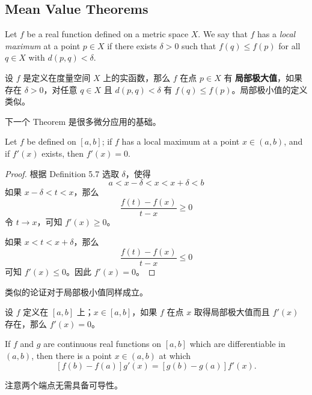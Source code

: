 \documentclass[../poma-notes.tex]{subfiles}
\begin{document}
\subsection*{Mean Value Theorems}

\begin{definition}
  Let $f$ be a real function defined on a metric space $X$. We say that $f$ has a \textit{local maximum} at a
  point $p \in X$ if there exists $\delta > 0$ such that $f(q) \le f(p)$ for all $q \in X$ with $d(p,q)<\delta$.
\end{definition}

\begin{anote}
  设 $f$ 是定义在度量空间 $X$ 上的实函数，那么 $f$ 在点 $p \in X$ 有 \textbf{局部极大值}，如果存在 $\delta > 0$，对任意
  $q \in X$ 且 $d(p,q) < \delta$ 有 $f(q) \le f(p)$。局部极小值的定义类似。
\end{anote}

下一个 Theorem 是很多微分应用的基础。

\begin{theorem}
  Let $f$ be defined on $[a, b]$; if $f$ has a local maximum at a point $x \in (a, b)$, and if $f'(x)$ exists,
  then $f'(x) = 0$.
\end{theorem}

\begin{proof}
  根据 Definition 5.7 选取 $\delta$，使得
  \[
    a < x - \delta < x < x + \delta < b
  \]
  如果 $x - \delta < t < x$，那么
  \[
    \frac{f(t) - f(x)}{t - x} \ge 0
  \]
  令 $t \to x$，可知 $f'(x) \ge 0$。

  如果 $x < t < x + \delta$，那么
  \[
    \frac{f(t) - f(x)}{t - x} \le 0
  \]
  可知 $f'(x) \le 0$。因此 $f'(x) = 0$。
\end{proof}

类似的论证对于局部极小值同样成立。

\begin{anote}
  设 $f$ 定义在 $[a, b]$ 上；$x \in [a, b]$，如果 $f$ 在点 $x$ 取得局部极大值而且 $f'(x)$ 存在，那么 $f'(x) = 0$。
\end{anote}

\begin{theorem}
  If $f$ and $g$ are continuous real functions on $[a, b]$ which are differentiable in $(a, b)$, then there is
  a point $x \in (a,b)$ at which
  \[
    [f(b) - f(a)] g'(x) = [g(b) - g(a)] f'(x).
  \]
\end{theorem}

注意两个端点无需具备可导性。
\end{document}
